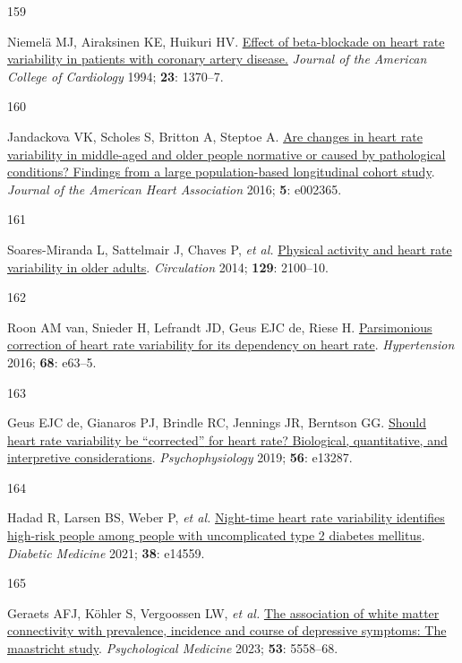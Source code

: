 \documentclass[
  a4paper,
  headsepline=true,
  open=left]{scrbook}
\newlength{\cslhangindent}
\newlength{\csllabelwidth}
\newlength{\cslentryspacingunit} %
\newenvironment{CSLReferences}[2] %
 {%
  \setlength{\parindent}{0pt}
  \ifodd #1
  \let\oldpar\par
  \def\par{\hangindent=\cslhangindent\oldpar}
  \fi
  \setlength{\parskip}{#2\cslentryspacingunit}
 }%
 {}
\newcommand{\CSLLeftMargin}[1]{\parbox[t]{\csllabelwidth}{#1}}
\newcommand{\CSLRightInline}[1]{\parbox[t]{\linewidth - \csllabelwidth}{#1}\break}
\begin{document}
\begin{CSLReferences}{0}{0}
\leavevmode{}%
\CSLLeftMargin{159 }%
\CSLRightInline{Niemelä MJ, Airaksinen KE, Huikuri HV.
\href{https://doi.org/10.1016/0735-1097(94)90379-4}{Effect of
beta-blockade on heart rate variability in patients with coronary artery
disease.} \emph{Journal of the American College of Cardiology} 1994;
\textbf{23}: 1370--7.}

\leavevmode{}%
\CSLLeftMargin{160 }%
\CSLRightInline{Jandackova VK, Scholes S, Britton A, Steptoe A.
\href{https://doi.org/doi:10.1161/JAHA.115.002365}{Are changes in heart
rate variability in middle{-}aged and older people normative or caused
by pathological conditions? Findings from a large population{-}based
longitudinal cohort study}. \emph{Journal of the American Heart
Association} 2016; \textbf{5}: e002365.}

\leavevmode{}%
\CSLLeftMargin{161 }%
\CSLRightInline{Soares-Miranda L, Sattelmair J, Chaves P, \emph{et al.}
\href{https://doi.org/10.1161/CIRCULATIONAHA.113.005361}{Physical
activity and heart rate variability in older adults}. \emph{Circulation}
2014; \textbf{129}: 2100--10.}

\leavevmode{}%
\CSLLeftMargin{162 }%
\CSLRightInline{Roon AM van, Snieder H, Lefrandt JD, Geus EJC de, Riese
H. \href{https://doi.org/10.1161/HYPERTENSIONAHA.116.08053}{Parsimonious
correction of heart rate variability for its dependency on heart rate}.
\emph{Hypertension} 2016; \textbf{68}: e63--5.}

\leavevmode{}%
\CSLLeftMargin{163 }%
\CSLRightInline{Geus EJC de, Gianaros PJ, Brindle RC, Jennings JR,
Berntson GG. \href{https://doi.org/10.1111/psyp.13287}{Should heart rate
variability be {``}corrected{''} for heart rate? Biological,
quantitative, and interpretive considerations}. \emph{Psychophysiology}
2019; \textbf{56}: e13287.}

\leavevmode{}%
\CSLLeftMargin{164 }%
\CSLRightInline{Hadad R, Larsen BS, Weber P, \emph{et al.}
\href{https://doi.org/10.1111/dme.14559}{Night-time heart rate
variability identifies high-risk people among people with uncomplicated
type 2 diabetes mellitus}. \emph{Diabetic Medicine} 2021; \textbf{38}:
e14559.}

\leavevmode{}%
\CSLLeftMargin{165 }%
\CSLRightInline{Geraets AFJ, Köhler S, Vergoossen LW, \emph{et al.}
\href{https://doi.org/10.1017/S0033291722002768}{The association of
white matter connectivity with prevalence, incidence and course of
depressive symptoms: The maastricht study}. \emph{Psychological
Medicine} 2023; \textbf{53}: 5558--68.}


\end{CSLReferences}
\end{document}
